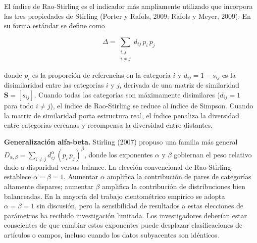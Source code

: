 \documentclass[
]{article}
\begin{document}
El índice de Rao-Stirling es el indicador más ampliamente utilizado que
incorpora las tres propiedades de Stirling (Porter y Rafols, 2009;
Rafols y Meyer, 2009). En su forma estándar se define como

\[\Delta = \sum_{\substack{i,j \\ i \neq j}} d_{ij}\, p_i\, p_j\]

donde \(p_i\) es la proporción de referencias en la categoría \(i\) y
\(d_{ij} = 1 - s_{ij}\) es la disimilaridad entre las categorías \(i\) y
\(j\), derivada de una matriz de similaridad \(\mathbf{S} = [s_{ij}]\).
Cuando todas las categorías son máximamente disimilares (\(d_{ij} = 1\)
para todo \(i \neq j\)), el índice de Rao-Stirling se reduce al índice
de Simpson. Cuando la matriz de similaridad porta estructura real, el
índice penaliza la diversidad entre categorías cercanas y recompensa la
diversidad entre distantes.

\textbf{Generalización alfa-beta.} Stirling (2007) propuso una familia
más general
\(D_{\alpha,\beta} = \sum_{i \neq j} d_{ij}^{\alpha}\, (p_i\, p_j)^{\beta}\),
donde los exponentes \(\alpha\) y \(\beta\) gobiernan el peso relativo
dado a disparidad versus balance. La elección convencional de
Rao-Stirling establece \(\alpha = \beta = 1\). Aumentar \(\alpha\)
amplifica la contribución de pares de categorías altamente dispares;
aumentar \(\beta\) amplifica la contribución de distribuciones bien
balanceadas. En la mayoría del trabajo cientométrico empírico se adopta
\(\alpha = \beta = 1\) sin discusión, pero la sensibilidad de resultados
a estas elecciones de parámetros ha recibido investigación limitada. Los
investigadores deberían estar conscientes de que cambiar estos
exponentes puede desplazar clasificaciones de artículos o campos,
incluso cuando los datos subyacentes son idénticos.
\end{document}
